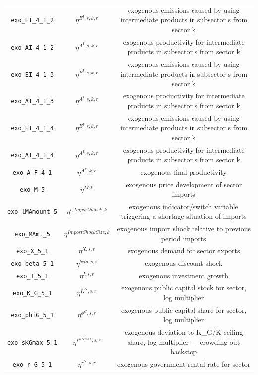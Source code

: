 \begin{center}
\begin{longtable}{ccc}
\texttt{exo\_EI\_4\_1\_2} & ${\eta^{E^{I},s,k,r}}$ & exogenous emissions caused by using intermediate products in subsector s from sector k\\
\texttt{exo\_AI\_4\_1\_2} & ${\eta^{A^{I},s,k,r}}$ & exogenous productivity for intermediate products in subsector s from sector k\\
\texttt{exo\_EI\_4\_1\_3} & ${\eta^{E^{I},s,k,r}}$ & exogenous emissions caused by using intermediate products in subsector s from sector k\\
\texttt{exo\_AI\_4\_1\_3} & ${\eta^{A^{I},s,k,r}}$ & exogenous productivity for intermediate products in subsector s from sector k\\
\texttt{exo\_EI\_4\_1\_4} & ${\eta^{E^{I},s,k,r}}$ & exogenous emissions caused by using intermediate products in subsector s from sector k\\
\texttt{exo\_AI\_4\_1\_4} & ${\eta^{A^{I},s,k,r}}$ & exogenous productivity for intermediate products in subsector s from sector k\\
\texttt{exo\_A\_F\_4\_1} & ${\eta^{A^F,k,r}}$ & exogenous final productivity\\
\texttt{exo\_M\_5} & ${\eta^{M,k}}$ & exogenous price development of sector imports\\
\texttt{exo\_lMAmount\_5} & ${\eta^{l,Import Shock,k}}$ & exogenous indicator/switch variable triggering a shortage situation of imports\\
\texttt{exo\_MAmt\_5} & ${\eta^{Import Shock Size,k}}$ & exogenous import shock relative to previous period imports\\
\texttt{exo\_X\_5\_1} & ${\eta^{X,s,r}}$ & exogenous demand for sector exports\\
\texttt{exo\_beta\_5\_1} & ${\eta^{beta,s,r}}$ & exogenous discount shock\\
\texttt{exo\_I\_5\_1} & ${\eta^{I,s,r}}$ & exogenous investment growth\\
\texttt{exo\_K\_G\_5\_1} & ${\eta^{K^G,s,r}}$ & exogenous public capital stock for sector, log multiplier\\
\texttt{exo\_phiG\_5\_1} & ${\eta^{\phi^{G},s,r}}$ & exogenous public capital share for sector, log multiplier\\
\texttt{exo\_sKGmax\_5\_1} & ${\eta^{s^{KGmax},s,r}}$ & exogenous deviation to K\_G/K ceiling share, log multiplier — crowding-out backstop\\
\texttt{exo\_r\_G\_5\_1} & ${\eta^{r^G,s,r}}$ & exogenous government rental rate for sector\\

\end{longtable}
\end{center}
